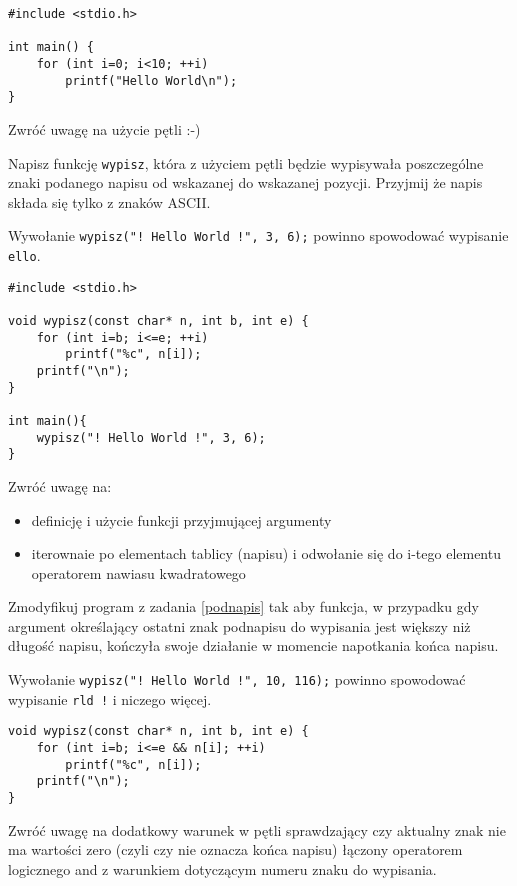 \dbEntryCheckResults
\begin{verbatim}
#include <stdio.h>

int main() {
	for (int i=0; i<10; ++i)
		printf("Hello World\n");
}
\end{verbatim}

\noindent Zwróć uwagę na użycie pętli :-)
\fi


\dbEntryCheckResults
Napisz funkcję \Verb#wypisz#, która z użyciem pętli będzie wypisywała poszczególne znaki podanego napisu od wskazanej do wskazanej pozycji. Przyjmij że napis składa się tylko z znaków ASCII.

Wywołanie \Verb#wypisz("! Hello World !", 3, 6);# powinno spowodować wypisanie \Verb#ello#.
\fi

\dbEntryCheckResults
\begin{verbatim}
#include <stdio.h>

void wypisz(const char* n, int b, int e) {
	for (int i=b; i<=e; ++i)
		printf("%c", n[i]);
	printf("\n");
}

int main(){
	wypisz("! Hello World !", 3, 6);
}
\end{verbatim}

\noindent Zwróć uwagę na:
\begin{itemize}
\item definicję i użycie funkcji przyjmującej argumenty
\item iterownaie po elementach tablicy (napisu) i odwołanie się do i-tego elementu operatorem nawiasu kwadratowego
\end{itemize}
\fi


\dbEntryCheckResults
Zmodyfikuj program z zadania \ref{podnapis} tak aby funkcja, w przypadku gdy argument określający ostatni znak podnapisu do wypisania jest większy niż długość napisu, kończyła swoje działanie w momencie napotkania końca napisu.

Wywołanie \Verb#wypisz("! Hello World !", 10, 116);# powinno spowodować wypisanie \Verb#rld !# i niczego więcej.
\fi

\dbEntryCheckResults
\begin{verbatim}
void wypisz(const char* n, int b, int e) {
	for (int i=b; i<=e && n[i]; ++i)
		printf("%c", n[i]);
	printf("\n");
}
\end{verbatim}

\noindent Zwróć uwagę na dodatkowy warunek w pętli sprawdzający czy aktualny znak nie ma wartości zero (czyli czy nie oznacza końca napisu) łączony operatorem logicznego and z warunkiem dotyczącym numeru znaku do wypisania.
\fi


